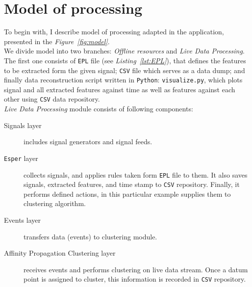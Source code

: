 \documentclass[11pt, letterpaper]{article}            %
\begin{document}
\section{Model of processing}
To begin with, I describe model of processing adapted in the application, presented in the \textit{Figure~\ref{fig:model}}.\\
We divide model into two branches: \emph{Offline resources} and \emph{Live Data Processing}. The first one consists of \texttt{EPL} file (see \textit{Listing~\ref{lst:EPL}}), that defines the features to be extracted form the given signal; \texttt{CSV} file which serves as a data dump; and finally data reconstruction script written in \texttt{Python}: \texttt{visualize.py}, which plots signal and all extracted features against time as well as features against each other using \texttt{CSV} data repository.\\
\emph{Live Data Processing} module consists of following components:
\begin{description}
	\item[Signals layer] includes signal generators and signal feeds.
	\item[\texttt{Esper} layer] collects signals, and applies rules taken form \texttt{EPL} file to them. It also saves signals, extracted features, and time stamp to \texttt{CSV} repository. Finally, it performs defined actions, in this particular example supplies them to clustering algorithm.
	\item[Events layer] transfers data (events) to clustering module.
	\item[Affinity Propagation Clustering layer] receives events and performs clustering on live data stream. Once a datum point is assigned to cluster, this information is recorded in \texttt{CSV} repository.
\end{description}
\end{document}
